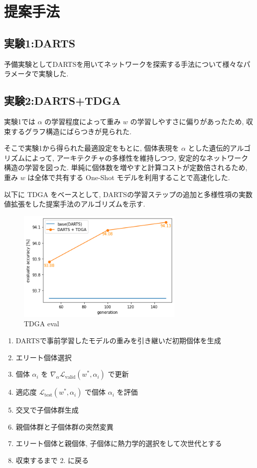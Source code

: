 \documentclass[a4paper,twoside,twocolumn,10pt]{article}
\begin{document}
\section{提案手法}
\subsection{実験1:DARTS}
予備実験としてDARTSを用いてネットワークを探索する手法について様々なパラメータで実験した.

\subsection{実験2:DARTS+TDGA}

実験1では $\alpha$ の学習程度によって重み $w$ の学習しやすさに偏りがあったため,
収束するグラフ構造にばらつきが見られた.

そこで実験1から得られた最適設定をもとに,
個体表現を $\alpha$ とした遺伝的アルゴリズムによって,
アーキテクチャの多様性を維持しつつ, 安定的なネットワーク構造の学習を図った.
単純に個体数を増やすと計算コストが定数倍されるため,
重み $w$ は全体で共有する One-Shot モデルを利用することで高速化した.

以下に TDGA をベースとして, DARTSの学習ステップの追加と多様性項の実数値拡張をした提案手法のアルゴリズムを示す.

\begin{figure}[t]
  \centering
  \includegraphics[width=80mm]{eval_tdga.png}
  \caption{TDGA eval}
  \label{fig:eval_tdga}
\end{figure}

\begin{enumerate}
  \item DARTSで事前学習したモデルの重みを引き継いだ初期個体を生成
  \item エリート個体選択
  \item 個体 $\alpha_i$ を $\displaystyle \nabla_\alpha \mathcal{L}_{\mathrm{valid}}(w^*, \alpha_i)$ で更新
  \item 適応度 $\displaystyle \mathcal{L}_{\mathrm{test}}(w^*, \alpha_i)$ で個体 $\alpha_i$ を評価
  \item 交叉で子個体群生成
  \item 親個体群と子個体群の突然変異
  \item エリート個体と親個体, 子個体に熱力学的選択をして次世代とする
  \item 収束するまで 2. に戻る
\end{enumerate}
\end{document}
